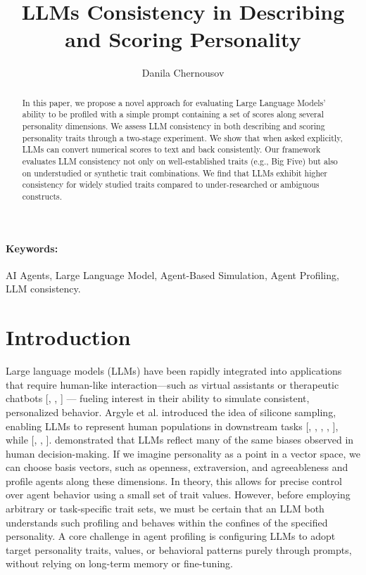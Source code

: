 \documentclass[12pt]{article}
\title{LLMs Consistency in Describing and Scoring Personality}
\author{
  Danila Chernousov\\
}
\begin{document}
\maketitle

\begin{abstract}
In this paper, we propose a novel approach for evaluating Large Language Models' ability to be profiled with a simple prompt containing a set of scores along several personality dimensions. We assess LLM consistency in both describing and scoring personality traits through a two-stage experiment. We show that when asked explicitly, LLMs can convert numerical scores to text and back consistently. Our framework evaluates LLM consistency not only on well-established traits (e.g., Big Five) but also on understudied or synthetic trait combinations. We find that LLMs exhibit higher consistency for widely studied traits compared to under-researched or ambiguous constructs.


\end{abstract}

\paragraph{Keywords:} AI Agents, Large Language Model, Agent-Based Simulation, Agent Profiling, LLM consistency.

\section{Introduction}

Large language models (LLMs) have been rapidly integrated into applications that require human-like interaction—such as virtual assistants or therapeutic chatbots [\cite{sun2024random}, \cite{argyle2023out}, \cite{park2023generative}] — fueling interest in their ability to simulate consistent, personalized behavior. Argyle et al. introduced the idea of silicone sampling, enabling LLMs to represent human populations in downstream tasks [\cite{argyle2023out}, \cite{santurkar2023whose}, \cite{manning2024automated}, \cite{jiang2023evaluating}, \cite{serapio2023personality}], while [\cite{horton2023large}, \cite{leng2024can}, \cite{jiang2023personallm}]. demonstrated that LLMs reflect many of the same biases observed in human decision-making. 
If we imagine personality as a point in a vector space, we can choose basis vectors, such as openness, extraversion, and agreeableness and profile agents along these dimensions. In theory, this allows for precise control over agent behavior using a small set of trait values. However, before employing arbitrary or task-specific trait sets, we must be certain that an LLM both understands such profiling and behaves within the confines of the specified personality. A core challenge in agent profiling is configuring LLMs to adopt target personality traits, values, or behavioral patterns purely through prompts, without relying on long-term memory or fine-tuning.
\end{document}
